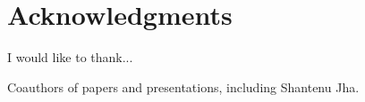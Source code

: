 \chapter*{Acknowledgments}
I would like to thank...

Coauthors of papers and presentations, including Shantenu Jha.



